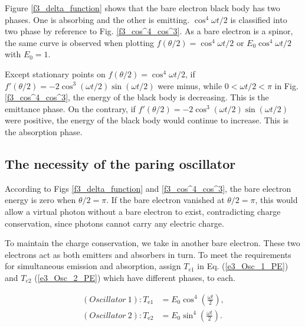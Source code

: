 \documentclass[%
 reprint,
 amsmath,amssymb,
 aps,
]{revtex4-1}
\numberwithin{equation}{section}
\begin{document}
    Figure \ref{f3_delta_function} shows that the bare electron black body has two phases. One is absorbing and the other is emitting. $\cos^{4} \omega t /2$ is classified into two phase by reference to Fig. \ref{f3_cos^4_cos^3}. As a bare electron is a spinor, the same curve is observed when plotting  $f(\theta /2)=\cos^{4} \omega t /2$ or $E_{0} \cos^{4}  \omega t /2$ with $E_{0} = 1$.

    Except stationary points on $f(\theta /2)=\cos^{4} \omega t /2$, if $f'(\theta /2) = -2 \cos^{3} (\omega t /2) \sin ( \omega t /2)$ were minus, while $ 0 < \omega t /2 < \pi $ in Fig. \ref{f3_cos^4_cos^3}, the energy of the black body is decreasing. This is the emittance phase. On the contrary, if $f'(\theta/2) = -2 \cos^{3} (\omega t /2) \sin (\omega t /2)$ were positive, the energy of the black body would continue to increase. This is the absorption phase.

\subsection{The necessity of the paring oscillator}
\label{The_necessity_of_the_paring_oscillator}

    According to Figs \ref{f3_delta_function} and \ref{f3_cos^4_cos^3}, the bare electron energy is zero when $ \theta /2 = \pi $. If the bare electron vanished at $ \theta /2 = \pi $, this would allow a virtual photon without a bare electron to exist, contradicting charge conservation, since photons cannot carry any electric charge.

    To maintain the charge conservation, we take in another bare electron. These two electrons act as both emitters and absorbers in turn. To meet the requirements for simultaneous emission and absorption, assign $T_{e1}$ in Eq. (\ref{e3_Osc_1_PE}) and $T_{e2}$ (\ref{e3_Osc_2_PE}) which have different phases, to each.

        \begin{equation}
            \begin{split}
                (Oscillator \ 1): T_{\mathrm{e1}}
                    &= E_{0} \cos^{4} \left( \frac{\omega t}{2} \right) , \\
                (Oscillator \ 2): T_{\mathrm{e2}}
                    &= E_{0} \sin^{4} \left( \frac{\omega t}{2} \right)
                    .
            \label{e3_Oscillators_Te1_Te2}
            \end{split}
        \end{equation}
\end{document}
